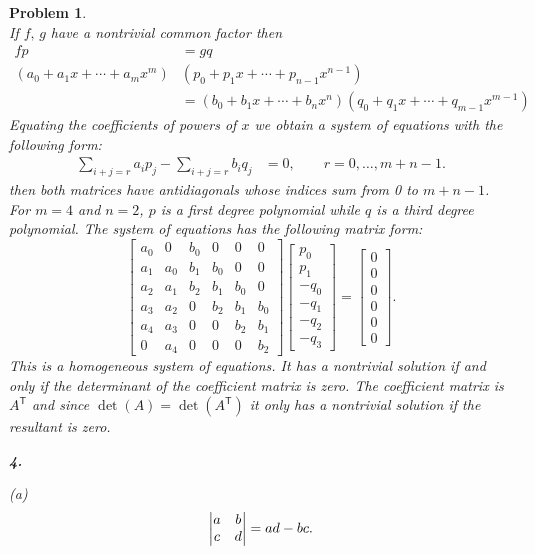 \documentclass{article}
\newcommand{\subno}[1]{\par\noindent\textbf{#1}}
\newcommand{\T}{\mathsf{T}}
\theoremstyle{pprop}
\newtheorem{problem}{Problem}[section]
\begin{document}
\begin{problem}
\[\]
If $f, \, g$ have a nontrivial common factor then
\begin{align*}
  f p & = g q  \\
  (a_0+a_1x+\cdots+a_mx^m) & (p_0+p_1x+\cdots+p_{n-1}x^{n-1})     \\
  & = (b_0+b_1x+\cdots+b_nx^n)(q_0+q_1x+\cdots+q_{m-1}x^{m-1})
\end{align*}
Equating the coefficients of powers of $x$ we obtain a system of equations with the following form: 
\begin{align*}
 \sum_{i+j=r} a_i p_j - \sum_{i+j=r} b_i q_j & = 0, \qquad r=0, \ldots, m+n-1.
\end{align*} 
then both matrices have antidiagonals whose indices sum from 0 to $m+n-1$. For $m=4$ and $n=2$, $p$ is a first degree 
polynomial while $q$ is a third degree polynomial. The system of equations has the following matrix form: 
\[
\left[\begin{matrix}a_{0} & 0 & b_{0} & 0 & 0 & 0\\a_{1} & a_{0} & b_{1} & b_{0} & 0 & 0\\a_{2} & a_{1} & b_{2} & b_{1} & b_{0} & 0\\a_{3} & a_{2} & 0 & b_{2} & b_{1} & b_{0}\\a_{4} & a_{3} & 0 & 0 & b_{2} & b_{1}\\0 & a_{4} & 0 & 0 & 0 & b_{2}\end{matrix}\right]
\left[
  \begin{matrix}
  p_0 \\ p_1 \\ -q_0 \\ -q_1 \\ -q_2 \\ -q_3 
  \end{matrix}
  \right]
  =
    \left[\begin{matrix}
  0 \\ 0 \\ 0 \\ 0 \\ 0 \\ 0 
  \end{matrix}
  \right].
\] 
This is a homogeneous system of equations. It has a nontrivial solution if and only if the determinant of the coefficient matrix is zero. 
The coefficient matrix is $A^\T$ and since $\det(A)=\det(A^\T)$ it only has a nontrivial solution if the resultant is zero. 
\subno{4.}
\par\noindent(a)  
\[
\mqty|a & b \\ c & d| = ad-bc.
\]
\end{problem}
\end{document}
